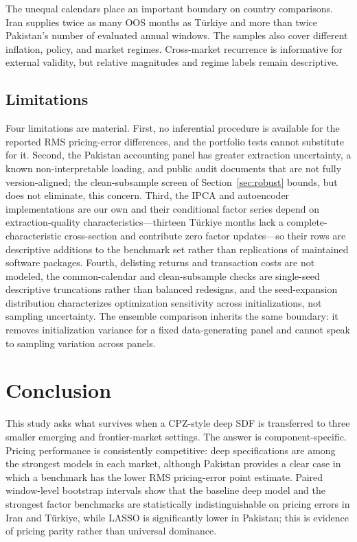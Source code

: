 \documentclass[12pt]{article}
\begin{document}
The unequal calendars place an important boundary on country comparisons. Iran supplies twice as many OOS months as T\"urkiye and more than twice Pakistan's number of evaluated annual windows. The samples also cover different inflation, policy, and market regimes. Cross-market recurrence is informative for external validity, but relative magnitudes and regime labels remain descriptive.

\subsection{Limitations}

Four limitations are material. First, no inferential procedure is available for the reported RMS pricing-error differences, and the portfolio tests cannot substitute for it. Second, the Pakistan accounting panel has greater extraction uncertainty, a known non-interpretable loading, and public audit documents that are not fully version-aligned; the clean-subsample screen of Section~\ref{sec:robust} bounds, but does not eliminate, this concern. Third, the IPCA and autoencoder implementations are our own and their conditional factor series depend on extraction-quality characteristics---thirteen T\"urkiye months lack a complete-characteristic cross-section and contribute zero factor updates---so their rows are descriptive additions to the benchmark set rather than replications of maintained software packages. Fourth, delisting returns and transaction costs are not modeled, the common-calendar and clean-subsample checks are single-seed descriptive truncations rather than balanced redesigns, and the seed-expansion distribution characterizes optimization sensitivity across initializations, not sampling uncertainty. The ensemble comparison inherits the same boundary: it removes initialization variance for a fixed data-generating panel and cannot speak to sampling variation across panels.

\section{Conclusion}\label{sec:concl}

This study asks what survives when a CPZ-style deep SDF is transferred to three smaller emerging and frontier-market settings. The answer is component-specific. Pricing performance is consistently competitive: deep specifications are among the strongest models in each market, although Pakistan provides a clear case in which a benchmark has the lower RMS pricing-error point estimate. Paired window-level bootstrap intervals show that the baseline deep model and the strongest factor benchmarks are statistically indistinguishable on pricing errors in Iran and T\"urkiye, while LASSO is significantly lower in Pakistan; this is evidence of pricing parity rather than universal dominance.
\end{document}
